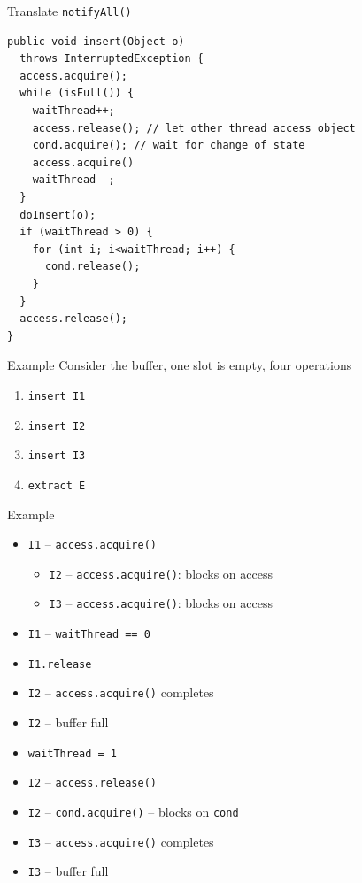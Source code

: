 \begin{frame}[fragile]{Translate \lstinline!notifyAll()!}
\begin{lstlisting}[basicstyle=\fontsize{9}{11}\selectfont\ttfamily]
public void insert(Object o) 
  throws InterruptedException {
  access.acquire();
  while (isFull()) {
    waitThread++;
    access.release(); // let other thread access object
    cond.acquire(); // wait for change of state
    access.acquire()
    waitThread--;
  }
  doInsert(o);	
  if (waitThread > 0) { 
    for (int i; i<waitThread; i++) {
      cond.release(); 
    } 
  }
  access.release(); 
}
\end{lstlisting}
\end{frame}

\begin{frame}{Example}
  Consider the buffer, one slot is empty, four operations


  \begin{enumerate}
  \item \lstinline!insert I1!
  \item \lstinline!insert I2!
  \item \lstinline!insert I3!
  \item \lstinline!extract E!
  \end{enumerate}
\end{frame}

\begin{frame}{Example}
  \begin{itemize}
  \item \lstinline!I1! -- \lstinline!access.acquire()!
    \begin{itemize}
    \item \lstinline!I2! -- \lstinline!access.acquire()!: blocks on
      access
    \item \lstinline!I3! -- \lstinline!access.acquire()!: blocks on
      access
    \end{itemize}
  \item \lstinline!I1! -- \lstinline!waitThread == 0!
  \item \lstinline!I1.release!
  \item \lstinline!I2! -- \lstinline!access.acquire()! completes
  \item \lstinline!I2! -- buffer full
  \item \lstinline!waitThread = 1!
  \item \lstinline!I2! -- \lstinline!access.release()!
  \item \lstinline!I2! -- \lstinline!cond.acquire()! -- blocks on \lstinline!cond!
  \item \lstinline!I3! -- \lstinline!access.acquire()! completes
  \item \lstinline!I3! -- buffer full
  \end{itemize}
\end{frame}


